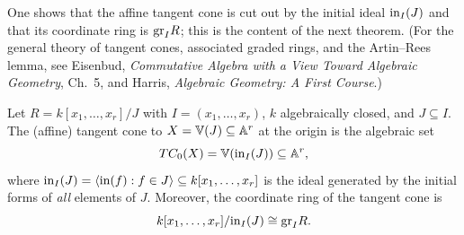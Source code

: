 \documentclass[11pt]{article}
\begin{document}
One shows that the affine tangent cone is cut out by the initial ideal $\text{in}_I(J)$ and that its coordinate ring is $\text{gr}_I R$; this is the content of the next theorem. (For the general theory of tangent cones, associated graded rings, and the Artin--Rees lemma, see Eisenbud, \emph{Commutative Algebra with a View Toward Algebraic Geometry}, Ch.~5, and Harris, \emph{Algebraic Geometry: A First Course}.)

\begin{theorem}\label{thm:tc}
    Let $R = k[x_1, \ldots, x_r]/J$ with $I = (x_1, \ldots, x_r)$, $k$ algebraically closed, and $J \subseteq I$. The (affine) tangent cone to $X = \mathbb V(J) \subseteq \mathbb A^r$ at the origin is the algebraic set
    \[TC_0(X) = \mathbb V(\text{in}_I(J)) \subseteq \mathbb A^r,\]
    where $\text{in}_I(J) = \langle \text{in}(f) : f \in J \rangle \subseteq k[x_1, \ldots, x_r]$ is the ideal generated by the initial forms of \emph{all} elements of $J$. Moreover, the coordinate ring of the tangent cone is
    \[k[x_1, \ldots, x_r]/\text{in}_I(J) \cong \text{gr}_I R.\]
\end{theorem}
\end{document}
